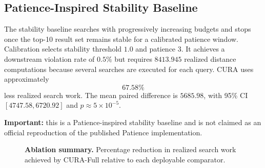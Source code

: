 \documentclass[10pt,twocolumn]{article}
\newcommand{\cura}{CURA}
\begin{document}
\subsection{Patience-Inspired Stability Baseline}
The stability baseline searches with progressively increasing budgets and stops once the top-10 result set remains stable for a calibrated patience window. Calibration selects stability threshold $1.0$ and patience $3$. It achieves a downstream violation rate of $0.5\%$ but requires $8413.945$ realized distance computations because several searches are executed for each query. \cura{} uses approximately
\[
\boxed{67.58\%}
\]
less realized search work. The mean paired difference is $5685.98$, with 95\% CI $[4747.58,6720.92]$ and $p\approx5\times10^{-5}$.

\textbf{Important:} this is a Patience-inspired stability baseline and is not claimed as an official reproduction of the published Patience implementation.

\begin{table}[!t]
\centering
\caption{Paired realized-work differences relative to \cura{}-Full. A positive value means the comparator performs more work.}
\label{tab:significance}
\end{table}

\begin{figure}[!t]
\centering
{}
\caption{\textbf{Ablation summary.} Percentage reduction in realized search work achieved by \cura{}-Full relative to each deployable comparator.}
\label{fig:ablation}
\end{figure}
\end{document}
